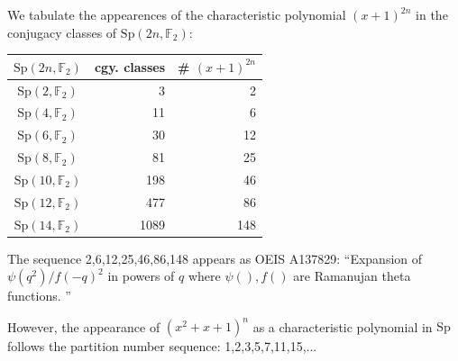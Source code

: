\documentclass[11pt,oneside]{article}
\newcommand{\Sp}{\mathrm{Sp}}
\newcommand{\Field}{\mathbb{F}}
\begin{document}
%
%

We tabulate the appearences of the characteristic polynomial 
$(x+1)^{2n}$ in the conjugacy classes of $\Sp(2n,\Field_2)$:
\begin{center}\begin{tabular}{c|r|r}
$\Sp(2n,\Field_2)$ & cgy. classes  & \# $(x+1)^{2n}$ \\
\hline
$\Sp(2,\Field_2)$   & 3     & 2 \\
$\Sp(4,\Field_2)$   & 11    & 6 \\
$\Sp(6,\Field_2)$   & 30    & 12 \\
$\Sp(8,\Field_2)$   & 81    & 25 \\
$\Sp(10,\Field_2)$  & 198   & 46 \\
$\Sp(12,\Field_2)$  & 477   & 86 \\
$\Sp(14,\Field_2)$  & 1089  & 148 \\
\end{tabular} \end{center}
The sequence 2,6,12,25,46,86,148 appears as OEIS A137829:
``Expansion of $\psi(q^2) / f(-q)^2$ in powers of $q$ where
$\psi(), f()$ are Ramanujan theta functions. 
''

However, the appearance of $(x^2+x+1)^n$ as a characteristic polynomial
in $\Sp$ follows the partition number sequence: 1,2,3,5,7,11,15,...

{}

\end{document}
